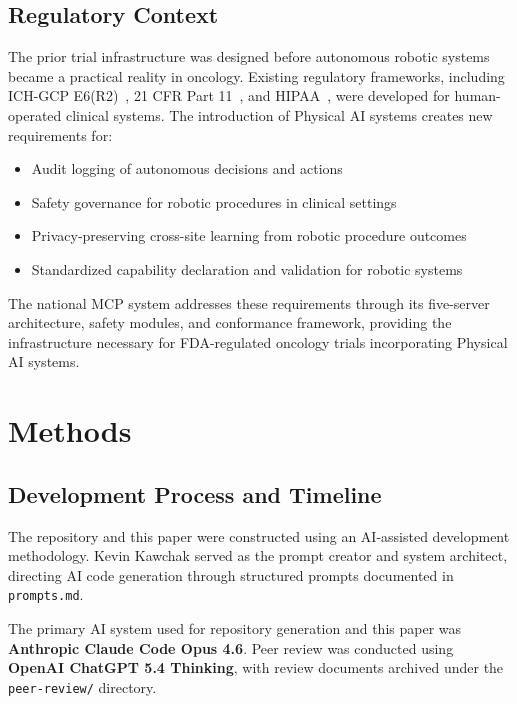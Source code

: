 \documentclass{article}
\begin{document}
\subsection{Regulatory Context}

The prior trial infrastructure was designed before autonomous robotic systems became a practical reality in oncology. Existing regulatory frameworks, including ICH-GCP E6(R2)~\cite{ichgcp2016}, 21 CFR Part 11~\cite{fda2003part11}, and HIPAA~\cite{hipaa1996}, were developed for human-operated clinical systems. The introduction of Physical AI systems creates new requirements for:

\begin{itemize}[leftmargin=*]
\item Audit logging of autonomous decisions and actions
\item Safety governance for robotic procedures in clinical settings
\item Privacy-preserving cross-site learning from robotic procedure outcomes
\item Standardized capability declaration and validation for robotic systems
\end{itemize}

The national MCP system addresses these requirements through its five-server architecture, safety modules, and conformance framework, providing the infrastructure necessary for FDA-regulated oncology trials incorporating Physical AI systems.

\section{Methods}
\label{sec:methods}

\subsection{Development Process and Timeline}

The repository and this paper were constructed using an AI-assisted development methodology. Kevin Kawchak served as the prompt creator and system architect, directing AI code generation through structured prompts documented in \texttt{prompts.md}.

The primary AI system used for repository generation and this paper was \textbf{Anthropic Claude Code Opus 4.6}. Peer review was conducted using \textbf{OpenAI ChatGPT 5.4 Thinking}, with review documents archived under the \texttt{peer-review/} directory.
\end{document}
